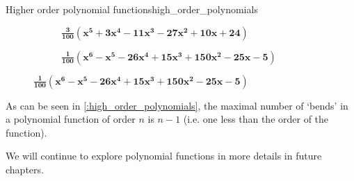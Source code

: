\begin{example}{Higher order polynomial functions}{high_order_polynomials}
\begin{figure}[H]
		\begin{subfigure}[b]{0.475\textwidth}
			\centering
			\caption{\textcolor{xgreen}{$\bm{\frac{3}{100}\left( x^{5}+3x^{4}-11x^{3}-27x^{2}+10x+24 \right)}$}}
		\end{subfigure}
		\hfill
		\begin{subfigure}[b]{0.475\textwidth}
			\centering
			\caption{\textcolor{xpurple}{$\bm{\frac{1}{100}\left( x^{6}-x^{5}-26x^{4}+15x^{3}+150x^{2}-25x-5\right)}$}}
		\end{subfigure}
	\end{figure}
\end{example}

As can be seen in \autoref{:high_order_polynomials}, the maximal number of `bends' in a polynomial function of order $n$ is $n-1$ (i.e. one less than the order of the function).

We will continue to explore polynomial functions in more details in future chapters.
